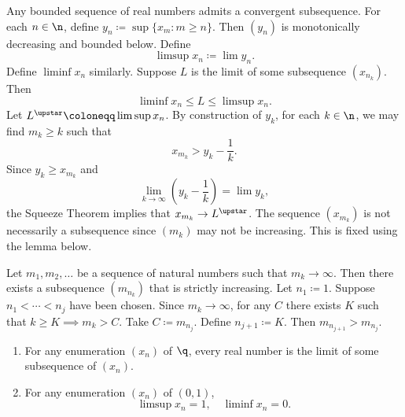\begin{theorem}{
    Any bounded sequence of real numbers admits a convergent subsequence.
}
    For each $n\in\n$, define $y_n \coloneqq \sup\{x_m : m\geq n\}$.
    Then $(y_n)$ is monotonically decreasing and bounded below.
    Define
    \[
        \limsup x_n \coloneqq \lim y_n.
    \]
    Define $\liminf x_n$ similarly.
    Suppose $L$ is the limit of some subsequence $(x_{n_k})$.
    Then
    \[
        \liminf x_n \leq L \leq \limsup x_n.
    \]
    Let $L^\upstar \coloneqq \limsup x_n$.
    By construction of $y_k$, for each $k\in\n$, we may find $m_k\geq k$ such that
    \[
        x_{m_k} > y_k - \dfrac{1}{k}.
    \]
    Since $y_k \geq x_{m_k}$ and
    \[
        \lim_{k\to\infty}\left(y_k - \dfrac{1}{k}\right) = \lim y_k,
    \]
    the Squeeze Theorem implies that $x_{m_k}\to L^\upstar$.
    The sequence $(x_{m_k})$ is not necessarily a subsequence since $(m_k)$ may not be increasing.
    This is fixed using the lemma below.
\end{theorem}

\begin{lemma}{
Let $m_1, m_2,\ldots$ be a sequence of natural numbers such that $m_k\to\infty$.
Then there exists a subsequence $(m_{n_k})$ that is strictly increasing.
}
Let $n_1 \coloneqq 1$.
Suppose $n_1 < \cdots < n_j$ have been chosen.
Since $m_k\to\infty$, for any $C$ there exists $K$ such that $k \geq K \implies m_k > C$.
Take $C \coloneqq m_{n_j}$.
Define $n_{j+1} \coloneqq K$.
Then $m_{n_{j+1}} > m_{n_j}$.
\end{lemma}

\begin{example}
    \begin{enumerate}[label={(\arabic*)}]
        \item For any enumeration $(x_n)$ of $\q$, every real number is the limit of some subsequence of $(x_n)$.
        \item For any enumeration $(x_n)$ of $(0,1)$,
        \[
        \limsup x_n = 1,\quad \liminf x_n = 0.
        \]
    \end{enumerate}
\end{example}